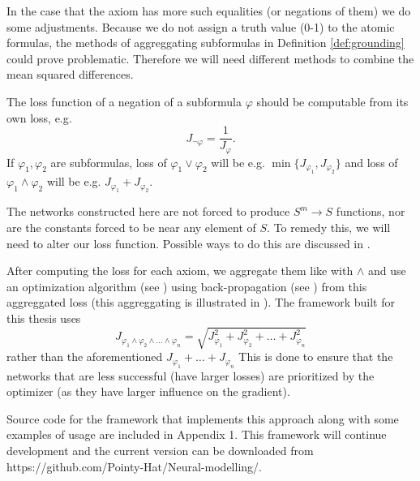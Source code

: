 In the case that the axiom has more such equalities (or negations of them) we do some adjustments. Because we do not assign a truth value (0-1) to the atomic formulas, the methods of aggreggating subformulas in Definition \autoref{def:grounding} could prove problematic. Therefore we will need different methods to combine the mean squared differences.

The loss function of a negation of a subformula $\varphi$ should be computable from its own loss, e.g. $$J_{\neg\varphi}=\frac{1}{J_{\varphi}}.$$ If $\varphi_1,\varphi_2$ are subformulas, loss of $\varphi_1\vee \varphi_2$ will be e.g. $\min\{J_{\varphi_1},J_{\varphi_2}\}$ and loss of $\varphi_1\wedge \varphi_2$ will be e.g. $J_{\varphi_1}+J_{\varphi_2}$.

The networks constructed here are not forced to produce $S^m\rightarrow S$ functions, nor are the constants forced to be near any element of $S$. To remedy this, we will need to alter our loss function. Possible ways to do this are discussed in .

After computing the loss for each axiom, we aggregate them like with $\wedge$ and use an optimization algorithm (see ) using back-propagation (see ) from this aggreggated loss (this aggreggating is illustrated in ). The framework built for this thesis uses $$J_{\varphi_1\wedge\varphi_2\wedge\dots\wedge\varphi_n}=\sqrt{J_{\varphi_1}^2+J_{\varphi_2}^2+\dots+J_{\varphi_n}^2}$$ rather than the aforementioned $J_{\varphi_1}+\dots+J_{\varphi_n}$ This is done to ensure that the networks that are less successful (have larger losses) are prioritized by the optimizer (as they have larger influence on the gradient).

Source code for the framework that implements this approach along with some examples of usage are included in Appendix 1. This framework will continue development and the current version can be downloaded from https://github.com/Pointy-Hat/Neural-modelling/.

